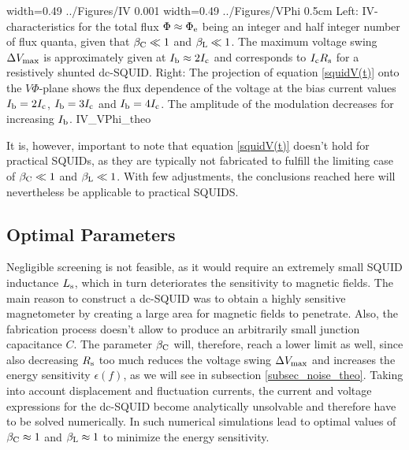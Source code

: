 { width=0.49\textwidth}
{../Figures/IV}
{0.001\textwidth} %
{width=0.49\textwidth}
{../Figures/VPhi}
{0.5cm} %
{Left: IV-characteristics for the total flux $\Phi\approx\Phi_{\rm e}$ being an integer and half integer number of flux quanta, given that $\beta_{\rm C}\ll 1$ and $\beta_{\rm L}\ll 1$. The maximum voltage swing $\Delta V_{\rm max}$ is approximately given at $I_{\rm b}\approx 2I_{\rm c}$ and corresponds to $I_{\rm c}R_{\rm s}$ for a resistively shunted dc-SQUID. Right: The projection of equation \ref{squidV(t)} onto the $V\Phi$-plane shows the flux dependence of the voltage at the bias current values $I_{\rm b}=2I_{\rm c}$, $I_{\rm b}=3I_{\rm c}$ and $I_{\rm b}=4I_{\rm c}$. The amplitude of the modulation decreases for increasing $I_{\rm b}$.}
{IV_VPhi_theo}

It is, however, important to note that equation \ref{squidV(t)} doesn't hold for practical SQUIDs, as they are typically not fabricated to fulfill the limiting case of $\beta_{\rm C}\ll 1$ and $\beta_{\rm L}\ll 1$. With few adjustments, the conclusions reached here will nevertheless be applicable to practical SQUIDS. 

\subsection{Optimal Parameters}\label{subsec_optparam_theo}

Negligible screening is not feasible, as it would require an extremely small SQUID inductance $L_{\rm s}$, which in turn deteriorates the sensitivity to magnetic fields. The main reason to construct a dc-SQUID was to obtain a highly sensitive magnetometer by creating a large area for magnetic fields to penetrate. Also, the fabrication process doesn't allow to produce an arbitrarily small junction capacitance $C$. The parameter $\beta_{\rm C}$ will, therefore, reach a lower limit as well, since also decreasing $R_{\rm s}$ too much reduces the voltage swing $\Delta V_{\rm max}$ and increases the energy sensitivity $\epsilon(f)$, as we will see in subsection \ref{subsec_noise_theo}. Taking into account displacement and fluctuation currents, the current and voltage expressions for the dc-SQUID become analytically unsolvable and therefore have to be solved numerically. In \cite{Tesche1977} such numerical simulations lead to optimal values of $\beta_{\rm C}\approx 1$ and $\beta_{\rm L}\approx 1$ to minimize the energy sensitivity. \\

